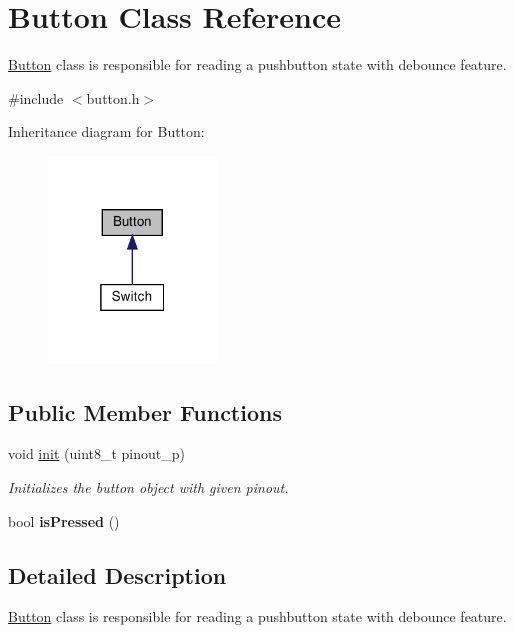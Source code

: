 \hypertarget{class_button}{}\section{Button Class Reference}
\label{class_button}


\hyperlink{class_button}{Button} class is responsible for reading a pushbutton state with debounce feature.  




{\ttfamily \#include $<$button.\+h$>$}



Inheritance diagram for Button\+:\nopagebreak
\begin{figure}[H]
\begin{center}
\leavevmode
\includegraphics[width=127pt]{class_button__inherit__graph}
\end{center}
\end{figure}
\subsection*{Public Member Functions}
\begin{DoxyCompactItemize}
\item 
void \hyperlink{class_button_a5768906065b7f1d4d146f1d9fc5ce890}{init} (uint8\+\_\+t pinout\+\_\+p)
\begin{DoxyCompactList}\small\item\em Initializes the button object with given pinout. \end{DoxyCompactList}\item 
\mbox{\label{class_button_a143f0a274b03d2bede8a84e37cd43dc7}} 
bool {\bfseries is\+Pressed} ()
\end{DoxyCompactItemize}


\subsection{Detailed Description}
\hyperlink{class_button}{Button} class is responsible for reading a pushbutton state with debounce feature. 

